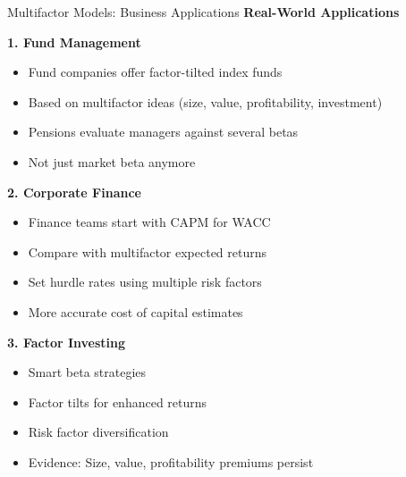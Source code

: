 \documentclass[aspectratio=169,10pt]{beamer}
\renewcommand{\small}{\fontsize{7pt}{8.5pt}\selectfont}
\renewcommand{\large}{\fontsize{9pt}{11pt}\selectfont}
\newcommand{\question}[1]{{\large\bfseries\color{crimson}#1}}
\begin{document}
	\begin{frame}{Multifactor Models: Business Applications}
		\question{Real-World Applications}
		\small
		
		\textbf{1. Fund Management}
		\begin{itemize}
			\item Fund companies offer factor-tilted index funds
			\item Based on multifactor ideas (size, value, profitability, investment)
			\item Pensions evaluate managers against several betas
			\item Not just market beta anymore
		\end{itemize}
		
		\vspace{0.1cm}
		\textbf{2. Corporate Finance}
		\begin{itemize}
			\item Finance teams start with CAPM for WACC
			\item Compare with multifactor expected returns
			\item Set hurdle rates using multiple risk factors
			\item More accurate cost of capital estimates
		\end{itemize}
		
		\vspace{0.1cm}
		\textbf{3. Factor Investing}
		\begin{itemize}
			\item Smart beta strategies
			\item Factor tilts for enhanced returns
			\item Risk factor diversification
			\item Evidence: Size, value, profitability premiums persist
		\end{itemize}
	\end{frame}
	
	
\end{document}
